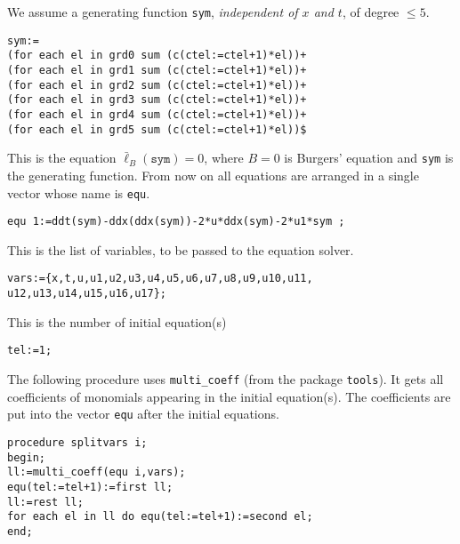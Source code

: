 We assume a generating function \texttt{sym}, \emph{independent of $x$ and
  $t$}, of degree $\leq 5$.
\begin{verbatim}
sym:=
(for each el in grd0 sum (c(ctel:=ctel+1)*el))+
(for each el in grd1 sum (c(ctel:=ctel+1)*el))+
(for each el in grd2 sum (c(ctel:=ctel+1)*el))+
(for each el in grd3 sum (c(ctel:=ctel+1)*el))+
(for each el in grd4 sum (c(ctel:=ctel+1)*el))+
(for each el in grd5 sum (c(ctel:=ctel+1)*el))$
\end{verbatim}

This is the equation $\bar\ell_B(\mathtt{sym})=0$, where $B=0$ is
Burgers' equation and \texttt{sym} is the generating function. From now on all
equations are arranged in a single vector whose name is \texttt{equ}.
\begin{verbatim}
equ 1:=ddt(sym)-ddx(ddx(sym))-2*u*ddx(sym)-2*u1*sym ;
\end{verbatim}

This is the list of variables, to be passed to the equation solver.
\begin{verbatim}
vars:={x,t,u,u1,u2,u3,u4,u5,u6,u7,u8,u9,u10,u11,
u12,u13,u14,u15,u16,u17};
\end{verbatim}

This is the number of initial equation(s)
\begin{verbatim}
tel:=1;
\end{verbatim}

The following procedure uses \texttt{multi\_coeff} (from the package
\texttt{tools}).  It gets all coefficients of monomials appearing in the
initial equation(s).  The coefficients are put into the vector \texttt{equ}
after the initial equations.
\begin{verbatim}
procedure splitvars i;
begin;
ll:=multi_coeff(equ i,vars);
equ(tel:=tel+1):=first ll;
ll:=rest ll;
for each el in ll do equ(tel:=tel+1):=second el;
end;
\end{verbatim}

